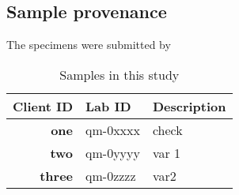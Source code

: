 \subsection{Sample provenance}

The specimens were submitted by \ldot

\begin{table}[h]
\begin{tabular}{| r | l | l |}
  \hline
  \textbf{Client ID} & \textbf{Lab ID} & \textbf{Description} \\
  \hline
  \textbf{one}       & qm-0xxxx        & check \\
  \hline
  \textbf{two}       & qm-0yyyy        & var 1 \\
  \hline
  \textbf{three}     & qm-0zzzz        & var2 \\
  \hline
\end{tabular}
\caption{Samples in this study}
\label{fig:SampleInfo}
\end{table}

\endinput